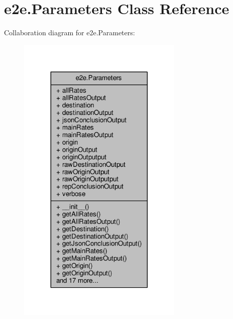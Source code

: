 \hypertarget{classe2e_1_1_parameters}{}\section{e2e.\+Parameters Class Reference}
\label{classe2e_1_1_parameters}


Collaboration diagram for e2e.\+Parameters\+:
\nopagebreak
\begin{figure}[H]
\begin{center}
\leavevmode
\includegraphics[width=224pt]{classe2e_1_1_parameters__coll__graph}
\end{center}
\end{figure}
